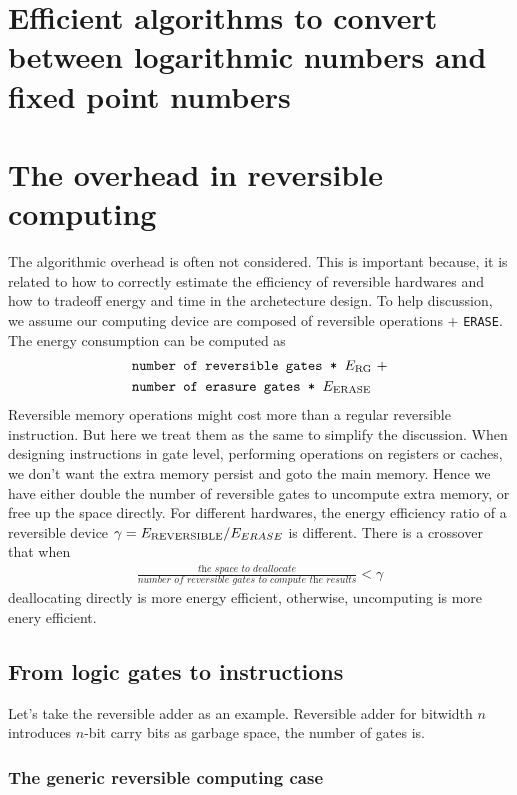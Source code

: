 \section{Efficient algorithms to convert between logarithmic numbers and fixed point numbers}

\section{The overhead in reversible computing}
The algorithmic overhead is often not considered. This is important because, it is related to how to correctly estimate the efficiency of reversible hardwares and how to tradeoff energy and time in the archetecture design.
To help discussion, we assume our computing device are composed of reversible operations + \texttt{ERASE}.
The energy consumption can be computed as
\begin{align}
    \begin{split}
    &\texttt{number of reversible gates * $E_{\rm RG}$} ~+\\
    &\texttt{number of erasure gates * $E_{\rm ERASE}$}
    \end{split}
\end{align}
Reversible memory operations might cost more than a regular reversible instruction. But here we treat them as the same to simplify the discussion.
When designing instructions in gate level, performing operations on registers or caches, we don't want the extra memory persist and goto the main memory. Hence we have either double the number of reversible gates to uncompute extra memory, or free up the space directly.
For different hardwares, the energy efficiency ratio of a reversible device $\gamma = E_{\rm REVERSIBLE}/E_{ERASE}$ is different.
There is a crossover that when 
\begin{align}
    \frac{\textit{the space to deallocate}}{\textit{number of reversible gates to compute the results}} < \gamma
\end{align}
deallocating directly is more energy efficient, otherwise, uncomputing is more enery efficient.
\subsection{From logic gates to instructions}
Let's take the reversible adder as an example. Reversible adder for bitwidth $n$ introduces $n$-bit carry bits as garbage space, the number of gates is.
\subsubsection{The generic reversible computing case}
